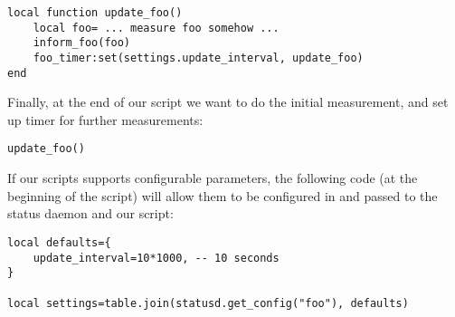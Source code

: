 \begin{verbatim}
local function update_foo()
    local foo= ... measure foo somehow ...
    inform_foo(foo)
    foo_timer:set(settings.update_interval, update_foo)
end
\end{verbatim}

Finally, at the end of our script we want to do the initial
measurement, and set up timer for further measurements:

\begin{verbatim}
update_foo()
\end{verbatim}


If our scripts supports configurable parameters, the following code
(at the beginning of the script) will allow them to be configured in
 and passed to the status daemon and our script:

\begin{verbatim}
local defaults={
    update_interval=10*1000, -- 10 seconds
}
                
local settings=table.join(statusd.get_config("foo"), defaults)
\end{verbatim}
